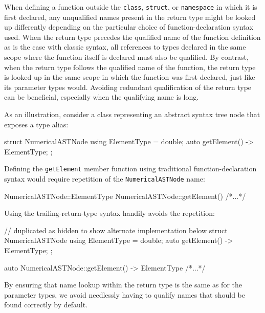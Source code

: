 When defining a function outside the \lstinline!class!, \lstinline!struct!, or
\lstinline!namespace! in which it is first declared, any unqualified names
present in the return type might be looked up differently depending on
the particular choice of function-declaration syntax used. When the
return type precedes the qualified name of the function definition as
is the case with classic syntax, all references to types declared in
the same scope where the function itself is declared must also be
qualified. By contrast, when the return type follows the
qualified name of the function,
the return type is looked up in the same scope in which the
function was first declared, just like its parameter types would. Avoiding redundant qualification of the return type  can be beneficial, especially when the qualifying name is long.

As an illustration, consider a class representing an abstract syntax
tree node that exposes a type alias:

\begin{emcppslisting}[emcppsbatch=e1]
struct NumericalASTNode
{
    using ElementType = double;
    auto getElement() -> ElementType;
};
\end{emcppslisting}

\noindent Defining the \lstinline!getElement! member function using traditional
function-declaration syntax would require repetition of the
\lstinline!NumericalASTNode! name:

\begin{emcppslisting}[emcppsbatch=e1]
NumericalASTNode::ElementType NumericalASTNode::getElement() { /*...*/ }
\end{emcppslisting}

\noindent Using the trailing-return-type syntax handily avoids the repetition:

\begin{emcppshiddenlisting}[emcppsbatch=e2]
// duplicated as hidden to show alternate implementation below
struct NumericalASTNode
{
    using ElementType = double;
    auto getElement() -> ElementType;
};
\end{emcppshiddenlisting}
\begin{emcppslisting}[emcppsbatch=e2]
auto NumericalASTNode::getElement() -> ElementType { /*...*/ }
\end{emcppslisting}

\noindent By ensuring that name lookup within the return type is the same as for
the parameter types, we avoid needlessly having to qualify names that
should be found correctly by default.

